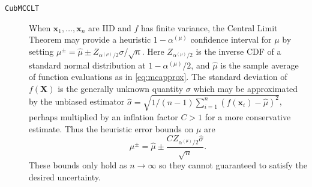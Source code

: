 \documentclass[graybox]{svmult}
\begin{document}
\begin{description}
    \item[\texttt{CubMCCLT}] When $\boldsymbol{x}_1,\dots,\boldsymbol{x}_n$ are IID and $f$ has finite variance, the Central Limit Theorem may provide a heuristic $1-\alpha^{(\mu)}$ confidence interval for $\mu$ by setting $\mu^\pm = \hat{\mu} \pm Z_{\alpha^{(\mu)}/2}\sigma/\sqrt{n}$. Here $Z_{\alpha^{(\mu)}/2}$ is the inverse CDF of a standard normal distribution at $1-\alpha^{(\mu)}/2$, and $\hat{\mu}$ is the sample average of function evaluations as in \eqref{eq:mcapprox}. The standard deviation of $f(\boldsymbol{X})$ is the generally unknown quantity $\sigma$ which may be approximated by the unbiased estimator $\hat{\sigma} = \sqrt{1/(n-1)\sum_{i=1}^n(f(\boldsymbol{x}_i)-\hat{\mu})^2}$, perhaps multiplied by an inflation factor $C>1$ for a more conservative estimate. Thus the heuristic error bounds on $\mu$ are
    \begin{equation*}
        \mu^\pm = \hat{\mu} \pm \frac{CZ_{\alpha^{(\mu)}/2}\hat{\sigma}}{\sqrt{n}}
        \label{eq:clt_mu_bounds}.
    \end{equation*}
    These bounds only hold as $n \to \infty$ so they cannot guaranteed to satisfy the desired uncertainty. 
    

\end{description}
\end{document}

